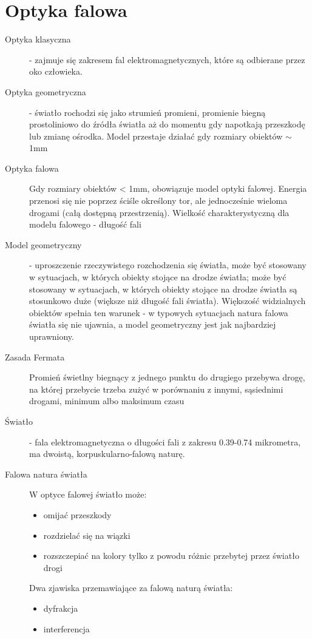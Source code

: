 \documentclass[a4paper,11pt]{article}
\begin{document}
\section{Optyka falowa}
\begin{description}
\item[Optyka klasyczna] - zajmuje się zakresem fal elektromagnetycznych, które są odbierane przez oko człowieka. 
\item[Optyka geometryczna] - światło rochodzi się jako strumień promieni, promienie biegną prostoliniowo do źródła światła aż do momentu gdy napotkają przeszkodę lub zmianę ośrodka. Model przestaje działać gdy rozmiary obiektów $\sim$ 1mm
\item[Optyka falowa] Gdy rozmiary obiektów < 1mm, obowiązuje model optyki falowej. Energia przenosi się nie poprzez ściśle określony tor, ale jednocześnie wieloma drogami (całą dostępną przestrzenią). Wielkość charakterystyczną dla modelu falowego - długość fali
\item[Model geometryczny] - uproszczenie rzeczywistego rozchodzenia się światła, może być stosowany w sytuacjach, w których obiekty stojące na drodze światła; może być stosowany w sytuacjach, w których obiekty stojące na drodze światła są stosunkowo duże (większe niż długość fali światła). Większość widzialnych obiektów spełnia ten warunek - w typowych sytuacjach natura falowa światła się nie ujawnia, a model geometryczny jest jak najbardziej uprawniony.
\item[Zasada Fermata] Promień świetlny biegnący z jednego punktu do drugiego przebywa drogę, na której przebycie trzeba zużyć w porównaniu z innymi, sąsiednimi drogami, minimum albo maksimum czasu
\item[Światło] - fala elektromagnetyczna o długości fali z zakresu 0.39-0.74 mikrometra, ma dwoistą, korpuskularno-falową naturę.
\item[Falowa natura światła] W optyce falowej światło może:\\
  \begin{itemize}
  \item omijać przeszkody
  \item rozdzielać się na wiązki
  \item rozszczepiać na kolory tylko z powodu różnic przebytej przez światło drogi
  \end{itemize}
  Dwa zjawiska przemawiające za falową naturą światła:
  \begin{itemize}
  \item dyfrakcja
  \item interferencja

\end{itemize}
\end{description}
\end{document}
